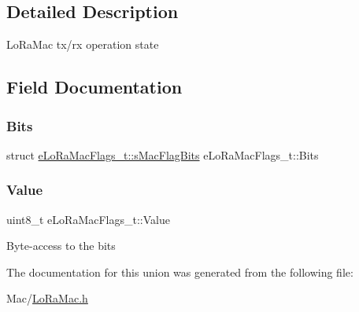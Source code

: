 \subsection{Detailed Description}
Lo\+Ra\+Mac tx/rx operation state 

\subsection{Field Documentation}
\mbox{\label{unioneLoRaMacFlags__t_a23c1c70ba3e3306aaaedd6f62c2aab15}} 
\subsubsection{\texorpdfstring{Bits}{Bits}}
{\footnotesize\ttfamily struct \hyperlink{structeLoRaMacFlags__t_1_1sMacFlagBits}{e\+Lo\+Ra\+Mac\+Flags\+\_\+t\+::s\+Mac\+Flag\+Bits} e\+Lo\+Ra\+Mac\+Flags\+\_\+t\+::\+Bits}

\mbox{\label{unioneLoRaMacFlags__t_a11a65b748bc5c36714d830d5daa93fe3}} 
\subsubsection{\texorpdfstring{Value}{Value}}
{\footnotesize\ttfamily uint8\+\_\+t e\+Lo\+Ra\+Mac\+Flags\+\_\+t\+::\+Value}

Byte-\/access to the bits 

The documentation for this union was generated from the following file\+:\begin{DoxyCompactItemize}
\item 
Mac/\hyperlink{LoRaMac_8h}{Lo\+Ra\+Mac.\+h}\end{DoxyCompactItemize}
